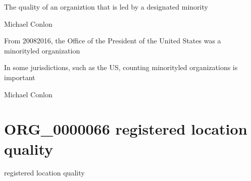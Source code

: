 \documentclass[letterpaper,10pt,english]{sphinxmanual}
\begin{document}
\begin{sphinxShadowBox}

\sphinxAtStartPar
The quality of an organiztion that is led by a designated minority
\end{sphinxShadowBox}

\begin{sphinxShadowBox}

\sphinxAtStartPar
Michael Conlon 
\end{sphinxShadowBox}

\begin{sphinxShadowBox}

\sphinxAtStartPar
From 2008\sphinxhyphen{}2016, the Office of the President of the United States was a minority\sphinxhyphen{}led organization
\end{sphinxShadowBox}

\begin{sphinxShadowBox}

\sphinxAtStartPar
In some jurisdictions, such as the US, counting minority\sphinxhyphen{}led organizations is important
\end{sphinxShadowBox}

\begin{sphinxShadowBox}

\sphinxAtStartPar
Michael Conlon 
\end{sphinxShadowBox}
\begin{quote}
\label{\detokenize{doc-ORG_0000066:org-0000066}}\label{\detokenize{doc-ORG_0000066:registered-location-quality}}\label{\detokenize{doc-ORG_0000066:org-0000066}}
\ignorespaces \end{quote}


\section{ORG\_0000066 \sphinxhyphen{} registered location quality}
\label{\detokenize{doc-ORG_0000066:org-0000066-registered-location-quality}}\label{\detokenize{doc-ORG_0000066:index-0}}\label{\detokenize{doc-ORG_0000066::doc}}
\begin{sphinxShadowBox}

\sphinxAtStartPar
registered location quality
\end{sphinxShadowBox}
\end{document}
